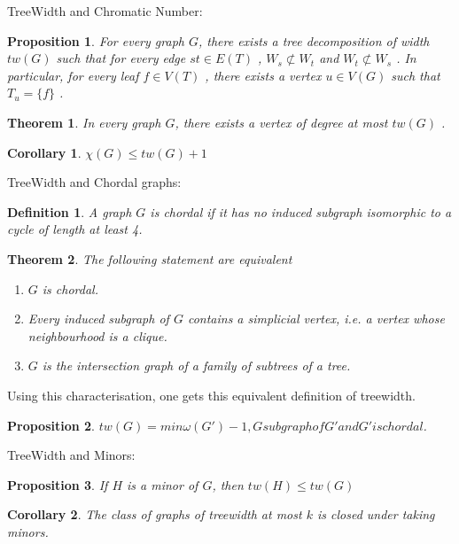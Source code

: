 \documentclass[12pt,a4paper]{article}
\newtheorem{theorem}{Theorem}
\newtheorem{prop}{Proposition}
\newtheorem{corollary}{Corollary}
\newtheorem{definition}{Definition}
\begin{document}
TreeWidth and Chromatic Number:

\begin{prop}
For every graph $G$, there exists a tree decomposition of width $tw( G )$ such that for
every edge $st \in E ( T )$ , $W_s \not\subset W_t$ and $W_t \not\subset W_s$ . In particular, for every leaf
$f \in V ( T )$ , there exists a vertex $u \in V ( G )$ such that $T_u = \{ f \}$ .
\end{prop}

\begin{theorem}
In every graph $G$, there exists a vertex of degree at most $tw( G )$ .
\end{theorem}

\begin{corollary}
$\chi( G ) ≤ tw( G ) + 1$
\end{corollary}

TreeWidth and Chordal graphs:
\begin{definition}
A graph $G$ is chordal if it has no induced subgraph isomorphic to a cycle of length
at least 4.
\end{definition}

\begin{theorem}
The following statement are equivalent
\begin{enumerate}
\item $G$ is chordal.
\item Every induced subgraph of $G$ contains a simplicial vertex, i.e. a vertex
whose neighbourhood is a clique.
\item $G$ is the intersection graph of a family of subtrees of a tree.
\end{enumerate}
\end{theorem}

Using this characterisation, one gets this equivalent definition of treewidth.

\begin{prop}
$tw( G ) = min{ω( G' ) − 1 , G subgraph of G' and G' is chordal }$.
\end{prop}

TreeWidth and Minors:
\begin{prop}
If $H$ is a minor of $G$, then $tw( H ) ≤ tw( G )$
\end{prop}

\begin{corollary}
The class of graphs of treewidth at most $k$ is closed under taking minors.
\end{corollary}
\end{document}
